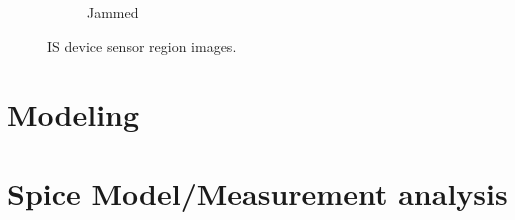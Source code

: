 \begin{figure}[h]
\begin{subfigure}[b]{\textwidth}
        \caption{Jammed}
    \end{subfigure}
    \caption{IS device sensor region images.}
    \label{fig:IS_data_raw}
\end{figure}


\FloatBarrier

\section{Modeling}


\section{Spice Model/Measurement analysis}
